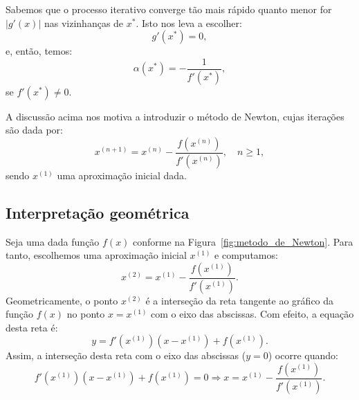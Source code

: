 \begin{ex}
Sabemos que o processo iterativo converge tão mais rápido quanto menor for $|g'(x)|$ nas vizinhanças de $x^*$. Isto nos leva a escolher:
\begin{equation}
  g'(x^*) = 0,
\end{equation}
e, então, temos:
\begin{equation}
  \alpha(x^*) = -\frac{1}{f'(x^*)},
\end{equation}
se $f'(x^*)\neq 0$.

A discussão acima nos motiva a introduzir o método de Newton, cujas iterações são dada por:
\begin{equation}
  x^{(n+1)} = x^{(n)} - \frac{f\left(x^{(n)}\right)}{f'\left(x^{(n)}\right)}, \quad n\geq 1,
\end{equation}
sendo $x^{(1)}$ uma aproximação inicial dada.

\subsection{Interpretação geométrica}

Seja uma dada função $f(x)$  conforme na Figura~\ref{fig:metodo_de_Newton}. Para tanto, escolhemos uma aproximação inicial $x^{(1)}$ e computamos:
\begin{equation}
  x^{(2)} = x^{(1)} - \frac{f(x^{(1)})}{f'(x^{(1)})}.
\end{equation}
Geometricamente, o ponto $x^{(2)}$ é a interseção da reta tangente ao gráfico da função $f(x)$ no ponto $x = x^{(1)}$ com o eixo das abscissas. Com efeito, a equação desta reta é:
\begin{equation}
  y = f'(x^{(1)})(x - x^{(1)}) + f(x^{(1)}).
\end{equation}
Assim, a interseção desta reta com o eixo das abscissas ($y=0$) ocorre quando:
\begin{equation}
  f'(x^{(1)})(x - x^{(1)}) + f(x^{(1)}) = 0\Rightarrow x = x^{(1)} - \frac{f(x^{(1)})}{f'(x^{(1)})}.
\end{equation}


\end{ex}
